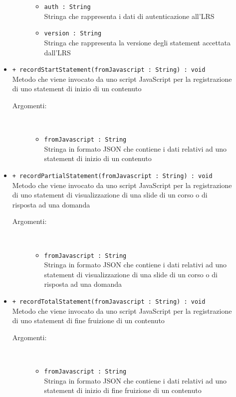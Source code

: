 \documentclass[../Tesi.tex]{subfiles}
\begin{document}
\begin{description}
\begin{itemize}
\begin{description}
\begin{itemize}
						\item \texttt{auth : String}\\
						Stringa che rappresenta i dati di autenticazione all'LRS

						\item \texttt{version : String}\\
						Stringa che rappresenta la versione degli statement accettata dall'LRS
					\end{itemize}
				\end{description}

				\item \texttt{+ recordStartStatement(fromJavascript : String) : void}\\
				Metodo che viene invocato da uno script JavaScript per la registrazione di uno statement di inizio di un contenuto
				\begin{description}
					\item[Argomenti:] \
					\begin{itemize}
						\item \texttt{fromJavascript : String}\\
						Stringa in formato JSON che contiene i dati relativi ad uno statement di inizio di un contenuto
					\end{itemize}
				\end{description}

				\item \texttt{+ recordPartialStatement(fromJavascript : String) : void}\\
				Metodo che viene invocato da uno script JavaScript per la registrazione di uno statement di visualizzazione di una slide di un corso o di risposta ad una domanda
				\begin{description}
					\item[Argomenti:] \
					\begin{itemize}
						\item \texttt{fromJavascript : String}\\
						Stringa in formato JSON che contiene i dati relativi ad uno statement di visualizzazione di una slide di un corso o di risposta ad una domanda
					\end{itemize}
				\end{description}

				\item \texttt{+ recordTotalStatement(fromJavascript : String) : void}\\
				Metodo che viene invocato da uno script JavaScript per la registrazione di uno statement di fine fruizione di un contenuto
				\begin{description}
					\item[Argomenti:] \
					\begin{itemize}
						\item \texttt{fromJavascript : String}\\
						Stringa in formato JSON che contiene i dati relativi ad uno statement di inizio di fine fruizione di un contenuto
					\end{itemize}
				\end{description}


\end{itemize}
\end{description}
\end{document}
